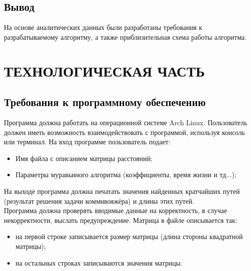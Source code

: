 \documentclass[a4paper,12pt]{article}
\begin{document}
\newpage
\subsection{Вывод}
На основе аналитических данных были разработаны требования к разрабатываемому алгоритму, а также приблизительная схема работы алгоритма.

\newpage
\section{ТЕХНОЛОГИЧЕСКАЯ ЧАСТЬ}
\subsection{Требования к программному обеспечению}
Программа должна работать на операционной системе Arch Linux. Пользователь должен иметь возможность взаимодействовать с программой, используя консоль или терминал. На вход программе пользователь подает:
\begin{itemize}
\item Имя файла с описанием матрицы расстояний;
\item Параметры муравьиного алгоритма (коэффициенты, время жизни и тд...);
\end{itemize}
На выходе программа должна печатать значения найденных кратчайших путей (результат решения задачи коммивояжёра) и длины этих путей.\\
Программа должна проверять вводимые данные на корректность, в случае некорректности, выслать предупреждение.
Матрица в файле описывается так:
\begin{itemize}
\item на первой строке записывается размер матрицы (длина стороны квадратной матрицы);
\item на остальных строках записываются значения матрицы.
\end{itemize}

\newpage
\end{document}
